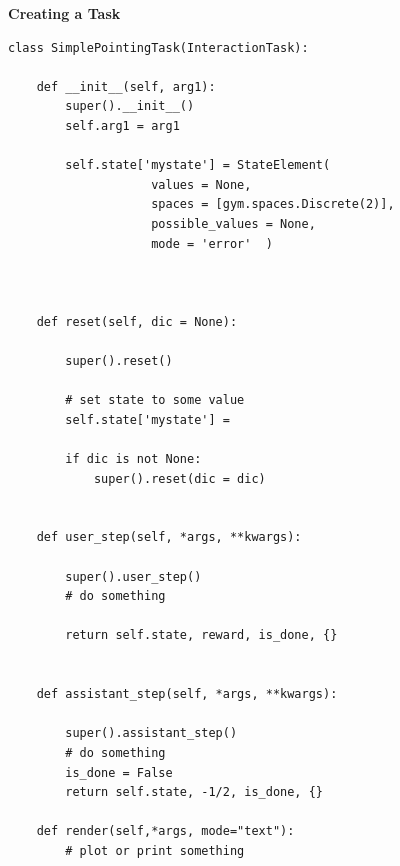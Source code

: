 \documentclass[11pt, xcolor = {dvipsnames}]{beamer}
\begin{document}
\begin{frame}[fragile]{\textbf{Creating a Task}}
\begin{adjustbox}{height=.4\textheight}\lstset{language=Python}
\lstset{frame=lines}
\lstset{basicstyle=\footnotesize}
\begin{lstlisting}
class SimplePointingTask(InteractionTask):
 
    def __init__(self, arg1):
        super().__init__()
        self.arg1 = arg1

        self.state['mystate'] = StateElement(
                    values = None,
                    spaces = [gym.spaces.Discrete(2)],
                    possible_values = None,
                    mode = 'error'  )



    def reset(self, dic = None):
    
        super().reset()

        # set state to some value
        self.state['mystate'] =

        if dic is not None:
            super().reset(dic = dic)


    def user_step(self, *args, **kwargs):
   
        super().user_step()
        # do something

        return self.state, reward, is_done, {}


    def assistant_step(self, *args, **kwargs):
      
        super().assistant_step()
        # do something
        is_done = False
        return self.state, -1/2, is_done, {}

    def render(self,*args, mode="text"):
        # plot or print something

\end{lstlisting}
\end{adjustbox}
\end{frame}
\end{document}
